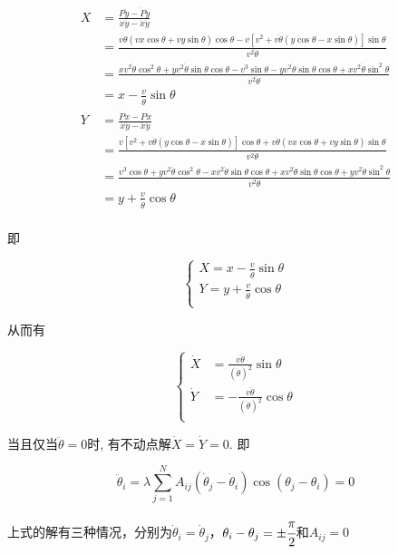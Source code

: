 \documentclass{article}
\begin{document}
$$
\begin{aligned}
	X&=\frac{P\ddot{y}-\dot{P}\dot{y}}{\dot{x}\ddot{y}-\ddot{x}\dot{y}}\\
	&=\frac{v\dot{\theta}\left( vx\cos \theta +vy\sin \theta \right) \cos \theta -v\left[ v^2+v\dot{\theta}\left( y\cos \theta -x\sin \theta \right) \right] \sin \theta}{v^2\dot{\theta}}\\
	&=\frac{xv^2\dot{\theta}\cos ^2\theta +yv^2\dot{\theta}\sin \theta \cos \theta -v^3\sin \theta -yv^2\dot{\theta}\sin \theta \cos \theta +xv^2\dot{\theta}\sin ^2\theta}{v^2\dot{\theta}}\\
	&=x-\frac{v}{\dot{\theta}}\sin\theta\\
	Y&=\frac{\dot{P}\dot{x}-P\ddot{x}}{\dot{x}\ddot{y}-\ddot{x}\dot{y}}\\
	&=\frac{v\left[ v^2+v\dot{\theta}\left( y\cos \theta -x\sin \theta \right) \right] \cos \theta +v\dot{\theta}\left( vx\cos \theta +vy\sin \theta \right) \sin \theta}{v^2\dot{\theta}}\\
	&=\frac{v^3\cos \theta +yv^2\dot{\theta}\cos ^2\theta -xv^2\dot{\theta}\sin \theta \cos \theta +xv^2\dot{\theta}\sin \theta \cos \theta +yv^2\dot{\theta}\sin ^2\theta}{v^2\dot{\theta}}\\
	&=y+\frac{v}{\dot{\theta}}\cos \theta\\
\end{aligned}
$$

即

$$
\begin{cases}
	X=x-\frac{v}{\dot{\theta}}\sin \theta\\
	Y=y+\frac{v}{\dot{\theta}}\cos \theta\\
\end{cases}
$$

从而有

$$
\left\{ \begin{aligned}
	\dot{X}&=\frac{v\ddot{\theta}}{\left( \dot{\theta} \right) ^2}\sin \theta\\
	\dot{Y}&=-\frac{v\ddot{\theta}}{\left( \dot{\theta} \right) ^2}\cos \theta\\
\end{aligned} \right. 
$$


当且仅当$\ddot{\theta}=0$时, 有不动点解$\dot{X}=\dot{Y}=0$. 即

$$
\ddot{\theta}_i=\lambda \sum_{j=1}^N{A_{ij}\left( \dot{\theta}_j-\dot{\theta}_i \right) \cos \left( \theta _j-\theta _i \right)}=0
$$

上式的解有三种情况，分别为$\dot{\theta}_i=\dot{\theta}_j$，$\theta _i-\theta _j=\pm\cfrac{\pi}{2}$和$A_{ij}=0$
\end{document}
